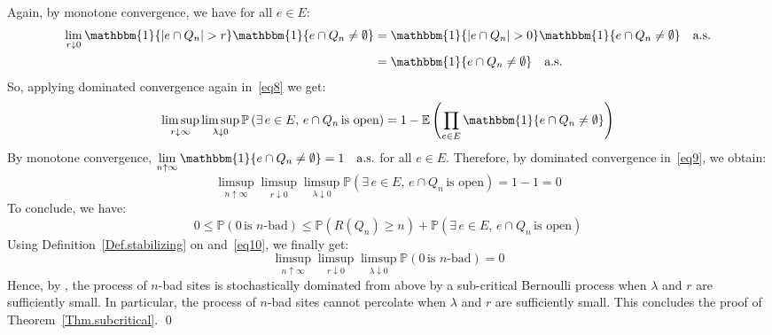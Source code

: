 \documentclass[10pt,a4paper]{amsart}
\theoremstyle{exampstyle}
\theoremstyle{exampnotations}
\begin{document}
Again, by monotone convergence, we have for all $e \in E$:
\begin{align*}
\lim_{r \downarrow 0} \mathbbm{1}\lbrace \vert e \cap Q_n \vert > r \rbrace \mathbbm{1}\lbrace e \cap Q_n \neq \emptyset \rbrace &= \mathbbm{1}\lbrace \vert e \cap Q_n \vert > 0 \rbrace \mathbbm{1}\lbrace e \cap Q_n \neq \emptyset \rbrace \quad \text{a.s.} \\ &= \mathbbm{1}\lbrace e \cap Q_n \neq \emptyset \rbrace \quad \text{a.s.}
\end{align*} 
So, applying dominated convergence again in~\eqref{eq8} we get:
\begin{equation}
\label{eq9}
   \limsup_{r \downarrow \infty}\limsup_{\lambda \downarrow 0} \mathbb{P}\left(\exists \, e \in E, \, e \cap Q_n \, \text{is open} \right)=1-\mathbb{E}\left(\prod_{e \in E } \mathbbm{1}\lbrace e \cap Q_n \neq \emptyset \rbrace \right)
\end{equation}
By monotone convergence, $\displaystyle \lim_{n \uparrow \infty}\mathbbm{1}\lbrace e \cap Q_n \neq \emptyset \rbrace = 1 \quad \text{a.s.}$ for all $e \in E$. Therefore, by dominated convergence in~\eqref{eq9}, we obtain:
\begin{equation}
    \label{eq10}
    \limsup_{n \uparrow \infty}\limsup_{r \downarrow 0}\limsup_{\lambda \downarrow 0} \mathbb{P}\left(\exists \, e \in E, \, e \cap Q_n \, \text{is open} \right) = 1-1 = 0
\end{equation}
To conclude, we have: 
\begin{equation*}
    0 \leq \mathbb{P}(0 \, \text{is $n$-bad}) \leq \mathbb{P}(R(Q_n) \geq n) + \mathbb{P}(\exists \, e \in E, \, e \cap Q_n \, \text{is open})
\end{equation*}
Using Definition~\ref{Def.stabilizing} on  and~\eqref{eq10}, we finally get:
\begin{equation*}
     \limsup_{n \uparrow \infty}\limsup_{r \downarrow 0}\limsup_{\lambda \downarrow 0} \mathbb{P}(0 \, \text{is $n$-bad}) =0
\end{equation*}
Hence, by \cite[Theorem 0.0]{liggett_domination_1997}, the process of $n$-bad sites is stochastically dominated from above by a sub-critical Bernoulli process when $\lambda$ and $r$ are sufficiently small. In particular, the process of $n$-bad sites cannot percolate when $\lambda$ and $r$ are sufficiently small. This concludes the proof of Theorem~\ref{Thm.subcritical}. \qed


\end{document}
